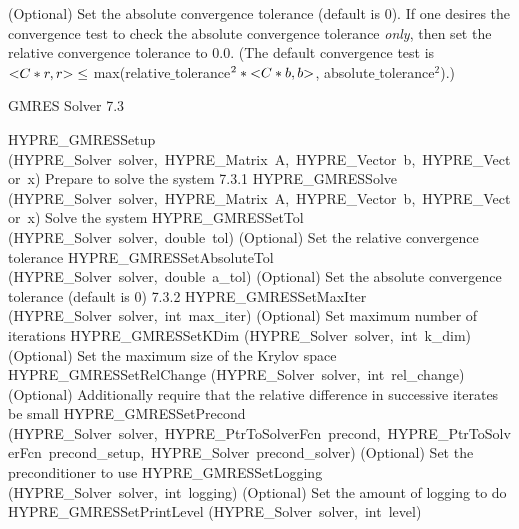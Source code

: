 \documentclass{article}
\begin{document}
\begin{cxxentry}
\begin{cxxentry}
\begin{cxxfunction}
\begin{cxxdoc}
(Optional) Set the absolute convergence tolerance (default is
0). If one desires the convergence test to check the absolute
convergence tolerance {\it only}, then set the relative convergence
tolerance to 0.0.  (The default convergence test is $ {\tt <}C*r,r{\tt >} \leq$
max(relative$\_$tolerance$^{2} \ast {\tt <}C*b, b{\tt >}$, absolute$\_$tolerance$^2$).)
\end{cxxdoc}
\end{cxxfunction}
\end{cxxentry}
\begin{cxxentry}
{}
        {GMRES Solver}
        {}
        {
}
        {7.3}
\begin{cxxnames}
        {HYPRE\_GMRESSetup}
        {(HYPRE\_Solver\ solver,\ HYPRE\_Matrix\ A,\ HYPRE\_Vector\ b,\ HYPRE\_Vector\ x)}
        {
Prepare to solve the system}
        {7.3.1}
        {HYPRE\_GMRESSolve}
        {(HYPRE\_Solver\ solver,\ HYPRE\_Matrix\ A,\ HYPRE\_Vector\ b,\ HYPRE\_Vector\ x)}
        {
Solve the system}
        {}
\label{cxx.7.3.3}
        {HYPRE\_GMRESSetTol}
        {(HYPRE\_Solver\ solver,\ double\ tol)}
        {
(Optional) Set the relative convergence tolerance}
        {}
\label{cxx.7.3.4}
        {HYPRE\_GMRESSetAbsoluteTol}
        {(HYPRE\_Solver\ solver,\ double\ a\_tol)}
        {
(Optional) Set the absolute convergence tolerance (default is 0)}
        {7.3.2}
        {HYPRE\_GMRESSetMaxIter}
        {(HYPRE\_Solver\ solver,\ int\ max\_iter)}
        {
(Optional) Set maximum number of iterations}
        {}
\label{cxx.7.3.5}
        {HYPRE\_GMRESSetKDim}
        {(HYPRE\_Solver\ solver,\ int\ k\_dim)}
        {
(Optional) Set the maximum size of the Krylov space}
        {}
\label{cxx.7.3.6}
        {HYPRE\_GMRESSetRelChange}
        {(HYPRE\_Solver\ solver,\ int\ rel\_change)}
        {
(Optional) Additionally require that the relative difference in
successive iterates be small}
        {}
\label{cxx.7.3.7}
        {HYPRE\_GMRESSetPrecond}
        {(HYPRE\_Solver\ solver,\ HYPRE\_PtrToSolverFcn\ precond,\ HYPRE\_PtrToSolverFcn\ precond\_setup,\ HYPRE\_Solver\ precond\_solver)}
        {
(Optional) Set the preconditioner to use}
        {}
\label{cxx.7.3.8}
        {HYPRE\_GMRESSetLogging}
        {(HYPRE\_Solver\ solver,\ int\ logging)}
        {
(Optional) Set the amount of logging to do}
        {}
\label{cxx.7.3.9}
        {HYPRE\_GMRESSetPrintLevel}
        {(HYPRE\_Solver\ solver,\ int\ level)}

\end{cxxnames}
\end{cxxentry}
\end{cxxentry}
\end{document}

